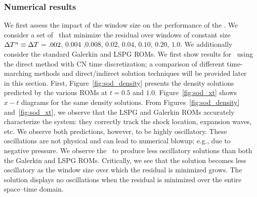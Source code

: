\subsubsection{Numerical results}
We first assess the impact of the window size on the performance of the \methodAcronymROMs.  We consider a set of \methodAcronymROMs\ that minimize the residual over windows of constant size 
$\Delta T^{n} \equiv \Delta T^{} =  .002$, $0.004$ ,$0.008$, $0.02$, $0.04$, $0.10$, $0.20$, $1.0$. We additionally consider the standard Galerkin and LSPG ROMs. We first show results for \methodAcronymROMs\ using the direct method with CN time discretization; a comparison of different time-marching methods and direct/indirect solution techniques will be provided later in this section. 
First, Figure~\ref{fig:sod_density} presents the density solutions predicted by the various ROMs at $t = 0.5$ and $1.0$. Figure~\ref{fig:sod_xt} shows 
$x-t$ diagrams for the same density solutions. From Figures~\ref{fig:sod_density} and~\ref{fig:sod_xt}, we observe that the LSPG and Galerkin ROMs accurately characterize 
the system: they correctly track the shock location, expansion waves, etc. We observe both predictions, however, to be highly oscillatory. These oscillations are 
not physical and can lead to numerical blowup; e.g., due to negative pressure. We observe the \methodAcronymROMs\ to produce less oscillatory solutions than both 
the Galerkin and LSPG ROMs. Critically, we see that the solution becomes less oscillatory as the window size over which the residual is minimized grows. The solution displays no oscillations when the residual is minimized over the entire space--time domain. 

